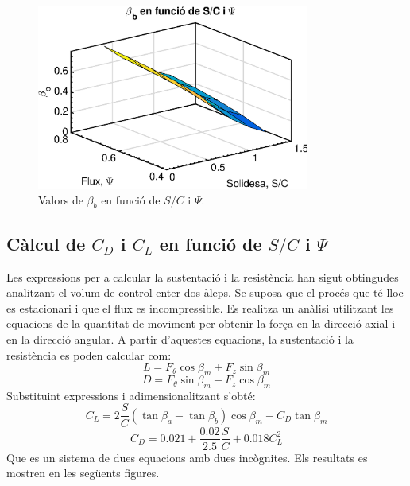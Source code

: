 \begin{figure}[H]
	\centering
	\includegraphics[width=0.8\textwidth]{./code/figures/parametres/betB}
	\caption{Valors de $\beta_b$ en funció de $S/C$ i $\Psi$.}
	\label{betB}
\end{figure}

\subsection{Càlcul de $C_D$ i $C_L$ en funció de $S/C$ i $\Psi$}
Les expressions per a calcular la sustentació i la resistència han sigut obtingudes analitzant el volum de control enter dos àleps. Se suposa que el procés que té lloc es estacionari i que el flux es incompressible. Es realitza un anàlisi utilitzant les equacions de la quantitat de moviment per obtenir la força en la direcció axial i en la direcció angular. A partir d'aquestes equacions, la sustentació i la resistència es poden calcular com: 
\begin{equation}
L= F_\theta \cos\beta_m+F_z \sin\beta_m
\end{equation}
\begin{equation}
D= F_\theta \sin\beta_m-F_z \cos\beta_m
\end{equation}
Substituint expressions i adimensionalitzant s'obté: 
\begin{equation}
C_L=2\frac{S}{C}(\tan\beta_a-\tan\beta_b)\cos\beta_m-C_D\tan\beta_m
\end{equation} 
\begin{equation}
C_D=0.021+\frac{0.02}{2.5}\frac{S}{C}+0.018C_L^2
\end{equation}
Que es un sistema de dues equacions amb dues incògnites. Els resultats es mostren en les següents figures.

